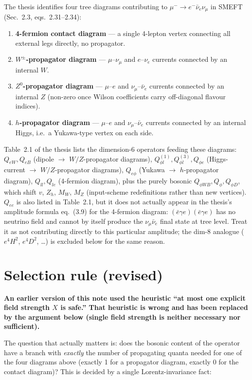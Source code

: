 \documentclass[11pt,a4paper]{article}
\newcommand{\Q}[1]{Q_{#1}}
\begin{document}
The thesis identifies four tree diagrams contributing to
$\mu^- \to e^- \bar\nu_e \nu_\mu$ in SMEFT (Sec.~2.3, eqs.~2.31--2.34):
\begin{enumerate}
\item \textbf{4-fermion contact diagram} --- a single 4-lepton vertex
  connecting all external legs directly, no propagator.
\item \textbf{$W^\pm$-propagator diagram} --- $\mu$--$\nu_\mu$ and
  $e$--$\nu_e$ currents connected by an internal $W$.
\item \textbf{$Z^0$-propagator diagram} --- $\mu$--$e$ and
  $\nu_\mu$--$\bar\nu_e$ currents connected by an internal $Z$ (non-zero
  once Wilson coefficients carry off-diagonal flavour indices).
\item \textbf{$h$-propagator diagram} --- $\mu$--$e$ and
  $\nu_\mu$--$\bar\nu_e$ currents connected by an internal Higgs, i.e.\ a
  Yukawa-type vertex on each side.
\end{enumerate}
Table~2.1 of the thesis lists the dimension-6 operators feeding these
diagrams: $\Q{eW}, \Q{eB}$ (dipole $\to$ $W/Z$-propagator diagrams),
$\Q{\phi l}^{(1)}, \Q{\phi l}^{(3)}, \Q{\phi e}$ (Higgs-current $\to$
$W/Z$-propagator diagrams), $\Q{e\phi}$ (Yukawa $\to$ $h$-propagator
diagram), $\Q{ll}, \Q{le}$ (4-fermion diagram), plus the purely bosonic
$\Q{\phi WB}, \Q{\phi}, \Q{\phi D}$, which shift $v$, $Z_h$, $M_W$, $M_Z$
(input-scheme redefinitions rather than new vertices). $\Q{ee}$ is also
listed in Table~2.1, but it does not actually appear in the thesis's
amplitude formula eq.~(3.9) for the 4-fermion diagram: $(\bar e\gamma e)(\bar
e\gamma e)$ has no neutrino field and cannot by itself produce the
$\nu_\mu\bar\nu_e$ final state at tree level. Treat it as not contributing
directly to this particular amplitude; the dim-8 analogue ($e^4H^2$,
$e^4D^2$, \ldots) is excluded below for the same reason.

\section{Selection rule (revised)}
\label{sec:rule}

\textbf{An earlier version of this note used the heuristic ``at most one
explicit field strength $X$ is safe.'' That heuristic is wrong and has been
replaced by the argument below (single field strength is neither necessary
nor sufficient).}

The question that actually matters is: does the bosonic content of the
operator have a branch with \emph{exactly} the number of propagating quanta
needed for one of the four diagrams above (exactly 1 for a propagator
diagram, exactly 0 for the contact diagram)? This is decided by a single
Lorentz-invariance fact:
\end{document}
